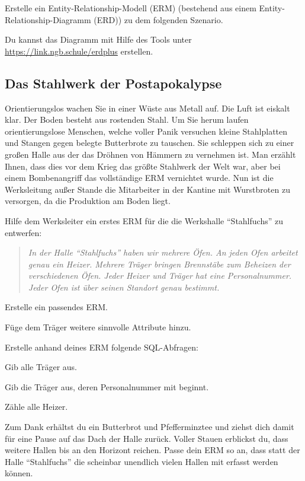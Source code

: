 \documentclass[11pt, a4paper, ngerman]{arbeitsblatt}
\begin{document}
\ReiheTitel

\begin{aufgabe}
Erstelle ein Entity-Relationship-Modell (ERM) (bestehend aus einem Entity-Relationship-Diagramm
(ERD)) zu dem folgenden Szenario.

Du kannst das Diagramm mit Hilfe des Tools unter \url{https://link.ngb.schule/erdplus} erstellen.

\begin{rahmen}\vspace*{-1em}
	\subsection*{Das Stahlwerk der Postapokalypse}

	Orientierungslos wachen Sie in einer Wüste aus Metall auf. Die Luft ist eiskalt klar.
	Der Boden besteht aus rostenden Stahl. Um Sie herum laufen orientierungslose Menschen,
	welche voller Panik versuchen kleine Stahlplatten und Stangen gegen belegte Butterbrote
	zu tauschen. Sie schleppen sich zu einer großen Halle aus der das Dröhnen von Hämmern zu
	vernehmen ist. Man erzählt Ihnen, dass dies vor dem Krieg das größte Stahlwerk der Welt
	war, aber bei einem Bombenangriff das vollständige ERM vernichtet wurde. Nun ist die
	Werksleitung außer Stande die Mitarbeiter in der Kantine mit Wurstbroten zu versorgen,
	da die Produktion am Boden liegt.

	Hilfe dem Werksleiter ein erstes ERM für die die Werkshalle \enquote{Stahlfuchs} zu entwerfen:

	\begin{quote}\itshape
		In der Halle \enquote{Stahlfuchs} haben wir mehrere Öfen. An jeden Ofen arbeitet genau ein
		Heizer. Mehrere Träger bringen Brennstäbe zum Beheizen der verschiedenen Öfen. Jeder
		Heizer und Träger hat eine Personalnummer. Jeder Ofen ist über seinen Standort genau
		bestimmt.
	\end{quote}

	\begin{enuma}[noitemsep]
		\item Erstelle ein passendes ERM.
		\item Füge dem Träger weitere sinnvolle Attribute hinzu.
		\item Erstelle anhand deines ERM folgende SQL-Abfragen:
		\begin{smallenum}
			\item Gib alle Träger aus.
			\item Gib die Träger aus, deren Personalnummer mit  beginnt.
			\item Zähle alle Heizer.
		\end{smallenum}
		\smallskip
		\item Zum Dank erhältst du ein Butterbrot und Pfefferminztee und ziehst dich damit für
		eine Pause auf das Dach der Halle zurück. Voller Stauen erblickst du, dass weitere Hallen
		bis an den Horizont reichen. Passe dein ERM so an, dass statt der Halle \enquote{Stahlfuchs}
		die scheinbar unendlich vielen Hallen mit erfasst werden können.
	\end{enuma}
\end{rahmen}
\end{aufgabe}
\end{document}
